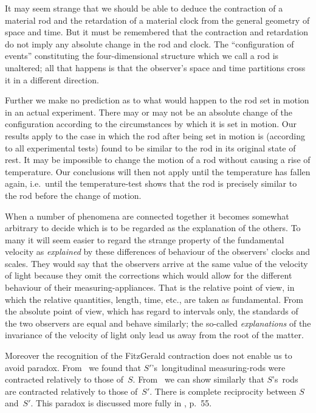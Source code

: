 \documentclass[12pt]{book}
\begin{document}
It may seem strange that we should be able to deduce the contraction of
a material rod and the retardation of a material clock from the general
geometry of space and time. But it must be remembered that the contraction
and retardation do not imply any absolute change in the rod and clock. The
``configuration of events'' constituting the four-dimensional structure which
we call a rod is unaltered; all that happens is that the observer's space and
time partitions cross it in a different direction.

Further we make no prediction as to what would happen to the rod set
in motion in an actual experiment. There may or may not be an absolute
change of the configuration according to the circumstances by which it is set
in motion. Our results apply to the case in which the rod after being set in
motion is (according to all experimental tests) found to be similar to the rod
in its original state of rest\footnotemark.\footnotetext
  {It may be impossible to change the motion of a rod without causing a rise of temperature.
  Our conclusions will then not apply until the temperature has fallen again, i.e.\ until the temperature-test
  shows that the rod is precisely similar to the rod before the change of motion.}

When a number of phenomena are connected together it becomes somewhat
arbitrary to decide which is to be regarded as the explanation of the
others. To many it will seem easier to regard the strange property of
the fundamental velocity as \emph{explained} by these differences of behaviour of
the observers' clocks and scales. They would say that the observers arrive
at the same value of the velocity of light because they omit the corrections
which would allow for the different behaviour of their measuring-appliances.
That is the relative point of view, in which the relative quantities, length,
time, etc., are taken as fundamental. From the absolute point of view, which
has regard to intervals only, the standards of the two observers are equal and
behave similarly; the so-called \emph{explanations} of the invariance of the velocity
of light only lead us away from the root of the matter.

Moreover the recognition of the FitzGerald contraction does not enable
us to avoid paradox. From~ we found that $S'$'s~longitudinal measuring-rods
were contracted relatively to those of~$S$. From~ we can show similarly
that $S$'s~rods are contracted relatively to those of~$S'$. There is complete
reciprocity between $S$ and~$S'$. This paradox is discussed more fully in , p.~55.
\end{document}

